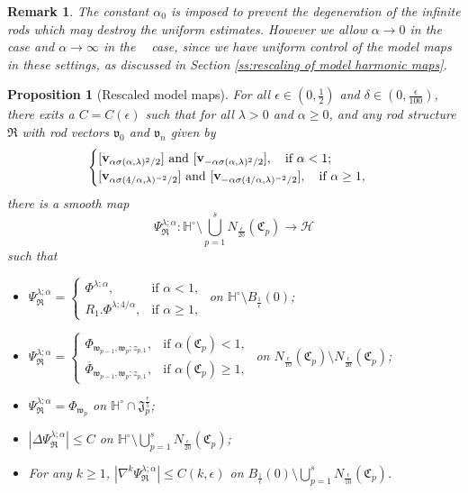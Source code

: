 \documentclass[a4paper,11pt]{amsart}
\newtheorem{proposition}[theorem]{Proposition}
\newtheorem{remark}[theorem]{Remark}
\theoremstyle{definition}
\numberwithin{equation}{section}
\newcommand{\mv} {\mathfrak v}
\newcommand{\mw} {\mathfrak w}
\newcommand{\mJ} {\mathfrak J}
\newcommand{\mR} {\mathfrak R}
\newcommand{\mC} {\mathfrak C}
\DeclareMathOperator{\bv}{{\bf v}}
\DeclareMathOperator{\ALFp}{ALF^+}
\DeclareMathOperator{\ALFm}{ALF^{--}}
\begin{document}
\begin{remark}
The constant $\alpha_0$ is imposed to prevent the degeneration of the infinite rods which may destroy the uniform estimates. However we allow $\alpha\rightarrow 0$ in the $\ALFm$ case and $\alpha\rightarrow\infty$ in the $\ALFp$ case, since we have uniform control of the model maps in these settings, as discussed in Section \ref{ss:rescaling of model harmonic maps}.
\end{remark}


\begin{proposition}[Rescaled model maps] \label{p:background map2}
	For all $\epsilon \in(0, \frac{1}{2})$ and $\delta\in (0, \frac{\epsilon}{100})$,  there exits a $C=C(\epsilon)$ such that for all $\lambda>0$ and $\alpha\geq 0$, and  any rod structure $\mR$  with rod vectors $\mv_0$ and $\mv_n$ given by
    $$\begin{cases}
        [\bv_{\alpha\sigma(\alpha,\lambda)^2/2}]\text{ and }[\bv_{-\alpha\sigma(\alpha,\lambda)^2/2}], \quad \text{if }\alpha<1;\\
        [\bv_{\alpha\sigma(4/\alpha,\lambda)^{-2}/2}]\text{ and }[\bv_{-\alpha\sigma(4/\alpha,\lambda)^{-2}/2}], \quad \text{if }\alpha\geq1,
    \end{cases}$$
    there is a smooth map 
	$$\Psi_{\mR}^{\lambda; \alpha}: \mathbb H^\circ\setminus \bigcup_{p=1}^sN_{\frac{\epsilon}{20}}(\mC_p)\rightarrow \mathcal H$$
	such that 
	\begin{itemize}
		\item $\Psi_{\mR}^{\lambda;\alpha}=\begin{cases}\Phi^{\lambda;\alpha}, &\text{if } \alpha<1, \\
        R_1. \Phi^{\lambda; 4/\alpha}, &\text{if } \alpha\geq 1,\end{cases}$ on $\mathbb H^\circ\setminus B_{\frac{1}{\epsilon}}(0)$;
		\item $\Psi_{\mR}^{\lambda;\alpha}=\begin{cases}
		    \Phi_{\mw_{p-1}, \mw_{p}; z_{p,1}},&\text{if }\alpha(\mC_p)<1,\\
            \overline{\Phi}_{\mw_{p-1}, \mw_{p}; z_{p,1}},&\text{if }\alpha(\mC_p)\geq1,
		\end{cases}$ on $N_{\frac{\epsilon}{10}}(\mC_p)\setminus N_{\frac{\epsilon}{20}}(\mC_p)$;
		\item  $\Psi_{\mR}^{\lambda;\alpha}=\Phi_{\mw_p}$ on $\mathbb H^\circ\cap  \mJ_p^{\frac{\epsilon}{5}}$;
		\item  $|\Delta\Psi_{\mR}^{\lambda;\alpha}|\leq C$ on $\mathbb H^\circ\setminus \bigcup_{p=1}^sN_{\frac{\epsilon}{20}}(\mC_p)$;
        \item For any $k\geq 1$, $|\nabla^k\Psi_{\mR}^{\lambda;\alpha}|\leq C(k, \epsilon)$ on $B_{\frac{1}{\epsilon}}(0)\setminus \bigcup_{p=1}^sN_{\frac{\epsilon}{10}}(\mC_p)$.
	\end{itemize}
\end{proposition}
\end{document}
